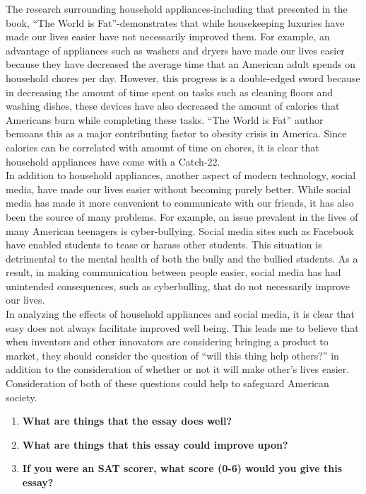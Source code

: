\documentclass[12pt]{book}
\renewcommand{\indent}{\hspace{1cm}}
\begin{document}
\indent The research surrounding household appliances-including that presented in the book, “The World is Fat”-demonstrates that while housekeeping luxuries have made our lives easier have not necessarily improved them. For example, an advantage of appliances such as washers and dryers have made our lives easier because they have decreased the average time that an American adult spends on household chores per day. However, this progress is a double-edged sword because in decreasing the amount of time spent on tasks such as cleaning floors and washing dishes, these devices have also decreased the amount of calories that Americans burn while completing these tasks. “The World is Fat” author bemoans this as a major contributing factor to obesity crisis in America. Since calories can be correlated with amount of time on chores, it is clear that household appliances have come with a Catch-22. \\

\indent In addition to household appliances, another aspect of modern technology, social media, have made our lives easier without becoming purely better. While social media has made it more convenient to communicate with our friends, it has also been the source of many problems. For example, an issue prevalent in the lives of many American teenagers is cyber-bullying. Social media sites such as Facebook have enabled students to tease or harass other students. This situation is detrimental to the mental health of both the bully and the bullied students. As a result, in making communication between people easier, social media has had unintended consequences, such as cyberbulling, that do not necessarily improve our lives. \\

\indent In analyzing the effects of household appliances and social media, it is clear that easy does not always facilitate improved well being. This leads me to believe that when inventors and other innovators are considering bringing a product to market, they should consider the question of “will this thing help others?” in addition to the consideration of whether or not it will make other's lives easier. Consideration of both of these questions could help to safeguard American society.  

\bigskip
\begin{enumerate}
\item{\textbf{What are things that the essay does well?}}
\vfill
\item{\textbf{What are things that this essay could improve upon?}}
\vfill
\item{\textbf{If you were an SAT scorer, what score (0-6) would you give this essay?}}
\vfill
\end{enumerate}
\end{document}

